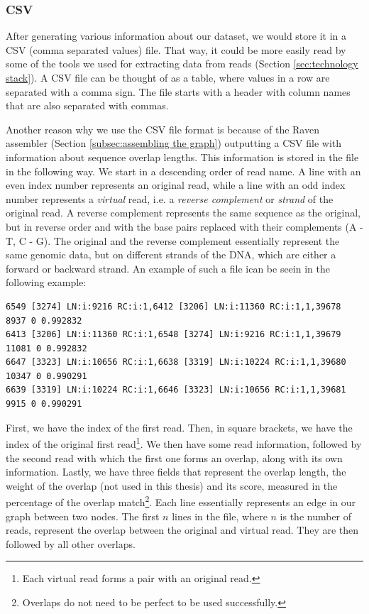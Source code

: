 \documentclass[times, utf8, diplomski, english]{fer_eng}
\begin{document}
\subsubsection{CSV}
\label{subsubsec:csv}

After generating various information about our dataset, we would store it in a CSV (comma separated values) file. That way, it could be  more easily read by some of the tools we used for extracting data from reads (Section \ref{sec:technology stack}). A CSV file can be thought of as a table, where values in a row are separated with a comma sign. The file starts with a header with column names that are also separated with commas.

Another reason why we use the CSV file format is because of the Raven assembler (Section \ref{subsec:assembling the graph}) outputting a CSV file with information about sequence overlap lengths. This information is stored in the file in the following way. We start in a descending order of read name. A line with an even index number represents an original read, while a line with an odd index number represents a \textit{virtual} read, i.e. a \textit{reverse complement} or \textit{strand} of the original read. A reverse complement represents the same sequence as the original, but in reverse order and with the base pairs replaced with their complements (A - T, C - G). The original and the reverse complement essentially represent the same genomic data, but on different strands of the DNA, which are either a forward or backward strand. An example of such a file ican be seein in the following example:
\begin{lstlisting}
6549 [3274] LN:i:9216 RC:i:1,6412 [3206] LN:i:11360 RC:i:1,1,39678 8937 0 0.992832
6413 [3206] LN:i:11360 RC:i:1,6548 [3274] LN:i:9216 RC:i:1,1,39679 11081 0 0.992832
6647 [3323] LN:i:10656 RC:i:1,6638 [3319] LN:i:10224 RC:i:1,1,39680 10347 0 0.990291
6639 [3319] LN:i:10224 RC:i:1,6646 [3323] LN:i:10656 RC:i:1,1,39681 9915 0 0.990291
\end{lstlisting}
First, we have the index of the first read. Then, in square brackets, we have the index of the original first read\footnote{Each virtual read forms a pair with an original read.}. We then have some read information, followed by the second read with which the first one forms an overlap, along with its own information. Lastly, we have three fields that represent the overlap length, the weight of the overlap (not used in this thesis) and its score, measured in the percentage of the overlap match\footnote{Overlaps do not need to be perfect to be used successfully.}. Each line essentially represents an edge in our graph between two nodes. The first $n$ lines in the file, where $n$ is the number of reads, represent the overlap between the original and virtual read. They are then followed by all other overlaps.
\end{document}
